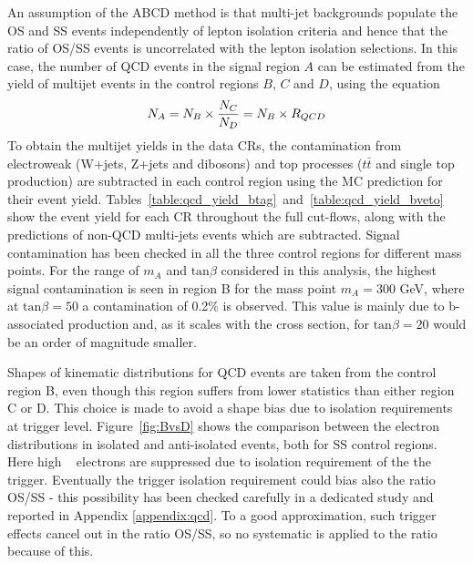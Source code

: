 An assumption of the ABCD method is that multi-jet backgrounds
populate the OS and SS events independently of lepton isolation
criteria and hence that the ratio of OS/SS events is uncorrelated 
with the lepton isolation selections. In this case, the number of QCD events in the signal region $A$ 
can be estimated from the yield of multijet events in the control regions $B$, $C$ and $D$, using the equation
\begin{equation} \label{eqn:qcdest}
N_{A}  = N_{B} \times \frac{N_{C}}{N_{D}} =  N_{B} \times R_{QCD}
\end{equation}
To obtain the multijet yields in the data CRs, the contamination
from electroweak (W+jets, Z+jets and dibosons) and top processes
($t\bar{t}$ and single top production) are  subtracted in each control region 
using the MC prediction for their event yield.  Tables~\ref{table:qcd_yield_btag}~and~\ref{table:qcd_yield_bveto}
show the event yield
for each CR throughout the full cut-flows, along with the
predictions of non-QCD multi-jets events which are subtracted.
Signal contamination has been checked in all the three control regions for different 
mass points. For the range of $m_{A}$ and $\mathrm{tan}\beta$ considered in this analysis, the highest signal contamination 
is seen in region B for the mass point $m_{A} = 300$ GeV, where at $\mathrm{tan}\beta = 50$ a contamination 
of 0.2\% is observed. This value is mainly due to b-associated production and,
as it scales with the cross section, for $\mathrm{tan}\beta = 20$ would be an order of magnitude smaller.

Shapes of kinematic distributions for QCD events are taken from the
control region B, even though this region suffers from lower statistics than either region C or D.
This choice is made to avoid a shape bias due to isolation requirements at trigger level.
Figure~\ref{fig:BvsD} shows the comparison between the electron \pt~ distributions in isolated 
and anti-isolated events, both for SS control regions. Here high \pt~ electrons are suppressed due to isolation requirement of the the trigger. 
Eventually the trigger isolation requirement could
bias also the ratio OS/SS - this possibility has been checked carefully
in a dedicated study and reported in Appendix \ref{appendix:qcd}.
To a good approximation, such trigger effects cancel out in the ratio
OS/SS, so no systematic is applied to the ratio because of this.

